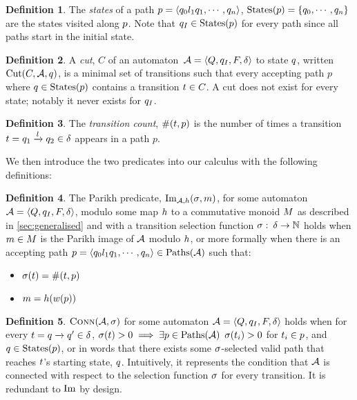 \documentclass[acmsmall,review,anonymous,screen]{acmart}\settopmatter{printfolios=true,printccs=false,printacmref=true}
\theoremstyle{definition}
\newtheorem{definition}{Definition}[section]
\begin{document}
\begin{definition}
  The \textit{states} of a path $p = \left\langle q_0 l_1 q_1
  , \cdots , q_n\right\rangle$, $\operatorname{States}(p) = \left\{q_0, \cdots ,
  q_n\right\}$ are the states visited along $p$. Note that $q_I \in
  \operatorname{States}(p)$ for every path since all paths start in the initial state.
\end{definition}

\begin{definition}
  A \textit{cut}, $C$ of an automaton~$\mathcal{A} = \left\langle Q, q_I, F, \delta\right\rangle$ to state
  $q$, written $\operatorname{Cut}(C, \mathcal{A}, q)$, is a minimal set of
  transitions such that every accepting path $p$ where $q \in
  \operatorname{States}(p)$ contains a transition $t \in C$. A cut does not
  exist for every state; notably it never exists for $q_I$.
\end{definition}

\begin{definition}
 The \textit{transition count}, $\operatorname{\#}(t, p)$ is the
 number of times a transition $t =
 q_1 \xrightarrow{l} q_2 \in \delta$ appears in a path
 $p$.
\end{definition}

We then introduce the two predicates into our calculus with the following
definitions:

\begin{definition}\label{def:single-image}
  The Parikh predicate, $\operatorname{Im}_{\mathcal{A}, h}(\operatorname{\sigma}, m)$, for some automaton
  $\mathcal{A} = \left\langle Q, q_I, F, \delta\right\rangle$, modulo some map $h$ to a commutative monoid
  $M$ as described in \cref{sec:generalised} and with a transition
  selection function $\operatorname{\sigma}:\: \delta \to \mathbb{N}$ holds when
  $m \in M$ is the Parikh image of $\mathcal{A}$ modulo
  $h$, or more formally when there is an accepting path $p =
  \left\langle q_0 l_1 q_1 , \cdots , q_n\right\rangle \in \operatorname{Paths}(\mathcal{A})$ such that:
  \begin{itemize}
    \item $\operatorname{\sigma}(t) = \operatorname{\#}(t, p)$
    \item $m = h(w(p))$
  \end{itemize}
\end{definition}

\begin{definition}
  $\operatorname{\textsc{Conn}}(\mathcal{A}, \operatorname{\sigma})$ for some automaton $\mathcal{A} =
  \left\langle Q, q_I, F, \delta\right\rangle$ holds when for every $t =
  q \xrightarrow{} q' \in \delta$, $\operatorname{\sigma}(t) > 0
  \implies \exists p \in \operatorname{Paths}(\mathcal{A})$ $\operatorname{\sigma}(t_i) > 0$
  for $t_i \in p$, and $q \in \operatorname{States}(p)$, or in words that
  there exists some $\operatorname{\sigma}$-selected valid path that reaches $t$'s
  starting state, $q$. Intuitively, it represents the condition that
  $\mathcal{A}$ is connected with respect to the selection function $\operatorname{\sigma}$ for
  every transition. It is redundant to $\operatorname{Im}$ by design.
\end{definition}
\end{document}
